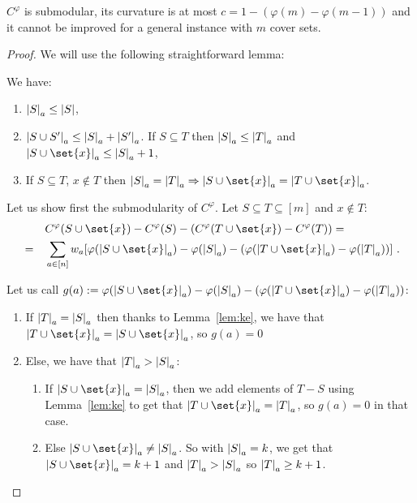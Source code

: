 \begin{proposition}
  $C^{\varphi}$ is submodular, its curvature is at most $c = 1 - (\varphi(m) - \varphi(m-1))$ and it cannot be improved for a general instance with $m$ cover sets.
  \label{prop:SubCurv}
\end{proposition}

\begin{proof}
  We will use the following straightforward lemma:

  \begin{lemma}[Properties of $\abs{S}_a = \abs{\set{i \in S : a \in T_i}}$.]
    We have:
  \begin{enumerate}
  \item $\abs{S}_a \leq \abs{S}$,
  \item $\abs{S \cup S'}_a\leq \abs{S}_a + \abs{S'}_a$. If $S \subseteq T$ then $\abs{S}_a \leq \abs{T}_a$ and $\abs{S\cup\set{x}}_a \leq \abs{S}_a + 1$,
  \item If $S \subseteq T$, $x \not\in T$ then $\abs{S}_a = \abs{T}_a \Rightarrow \abs{S\cup\set{x}}_a = \abs{T\cup\set{x}}_a$.
  \end{enumerate}
  \label{lem:ke}
\end{lemma}
  
  Let us show first the submodularity of $C^{\varphi}$. Let $S \subseteq T \subseteq [m]$ and $x \not\in T$:
  \begin{equation}
    \begin{aligned}
      &&& C^{\varphi}(S \cup \set{x}) - C^{\varphi}(S) - (C^{\varphi}(T \cup \set{x}) - C^{\varphi}(T))= \\
      &=&& \sum_{a \in [n]} w_a[\varphi(\abs{S\cup\set{x}}_a) - \varphi(\abs{S}_a) - (\varphi(\abs{T\cup\set{x}}_a) - \varphi(\abs{T}_a))]\ .\\
    \end{aligned}
  \end{equation}

  Let us call $g(a) := \varphi(\abs{S\cup\set{x}}_a) - \varphi(\abs{S}_a) - (\varphi(\abs{T\cup\set{x}}_a) - \varphi(\abs{T}_a))$:
  \begin{enumerate}
  \item If $\abs{T}_a = \abs{S}_a$ then thanks to Lemma~\ref{lem:ke}, we have that $\abs{T\cup\set{x}}_a = \abs{S\cup\set{x}}_a$, so $g(a) = 0$
  \item Else, we have that $\abs{T}_a > \abs{S}_a$:
    \begin{enumerate}
    \item If $\abs{S\cup\set{x}}_a = \abs{S}_a$, then we add elements of $T-S$ using Lemma~\ref{lem:ke} to get that $\abs{T\cup\set{x}}_a = \abs{T}_a$, so $g(a)=0$ in that case.
    \item Else $\abs{S\cup\set{x}}_a \not= \abs{S}_a$. So with $\abs{S}_a = k$, we get that $\abs{S\cup\set{x}}_a = k+1$ and $\abs{T}_a > \abs{S}_a$ so $\abs{T}_a \geq k+1$.


\end{enumerate}
\end{enumerate}
\end{proof}

